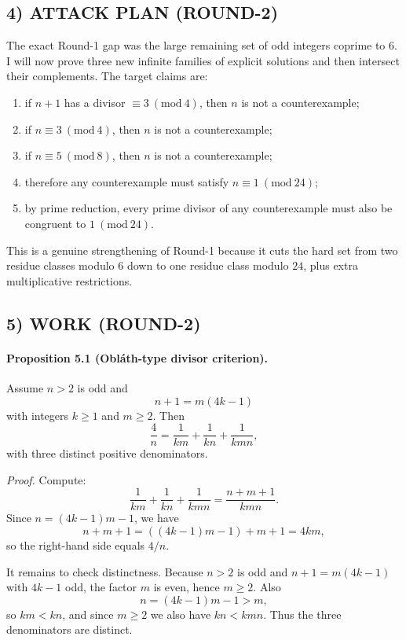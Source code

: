 \subsection*{4) ATTACK PLAN (ROUND-2)}
The exact Round-1 gap was the large remaining set of odd integers coprime to $6$. I will now prove three new infinite families of explicit solutions and then intersect their complements. The target claims are:
\begin{enumerate}
\item if $n+1$ has a divisor $\equiv 3 \ (\mathrm{mod}\ 4)$, then $n$ is not a counterexample;
\item if $n\equiv 3 \ (\mathrm{mod}\ 4)$, then $n$ is not a counterexample;
\item if $n\equiv 5 \ (\mathrm{mod}\ 8)$, then $n$ is not a counterexample;
\item therefore any counterexample must satisfy $n\equiv 1 \ (\mathrm{mod}\ 24)$;
\item by prime reduction, every prime divisor of any counterexample must also be congruent to $1 \ (\mathrm{mod}\ 24)$.
\end{enumerate}
This is a genuine strengthening of Round-1 because it cuts the hard set from two residue classes modulo $6$ down to one residue class modulo $24$, plus extra multiplicative restrictions.

\subsection*{5) WORK (ROUND-2)}

\paragraph{Proposition 5.1 (Obl\'ath-type divisor criterion).}
Assume $n>2$ is odd and
\[
 n+1=m(4k-1)
\]
with integers $k\ge 1$ and $m\ge 2$. Then
\[
 \frac{4}{n}=\frac{1}{km}+\frac{1}{kn}+\frac{1}{kmn},
\]
with three distinct positive denominators.

\emph{Proof.}
Compute:
\[
\frac{1}{km}+\frac{1}{kn}+\frac{1}{kmn}
 =\frac{n+m+1}{kmn}.
\]
Since $n=(4k-1)m-1$, we have
\[
 n+m+1=((4k-1)m-1)+m+1=4km,
\]
so the right-hand side equals $4/n$.

It remains to check distinctness. Because $n>2$ is odd and $n+1=m(4k-1)$ with $4k-1$ odd, the factor $m$ is even, hence $m\ge 2$. Also
\[
 n=(4k-1)m-1>m,
\]
so $km<kn$, and since $m\ge 2$ we also have $kn<kmn$. Thus the three denominators are distinct.

